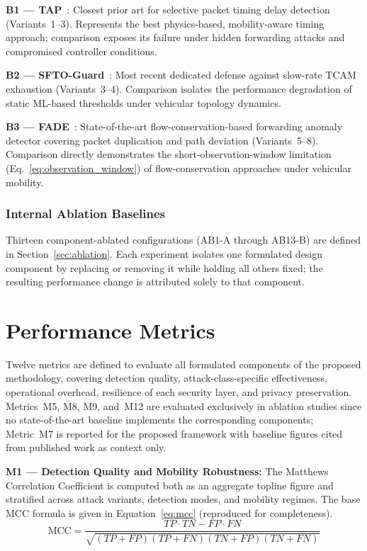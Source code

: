 \documentclass[12pt, a4paper]{report}
\begin{document}
{{\textbf{B1 — TAP}~\cite{Arsalan2018}: Closest prior art for
selective packet timing delay detection (Variants~1--3).
Represents the best physics-based, mobility-aware timing approach;
comparison exposes its failure under hidden forwarding attacks and
compromised controller conditions.

\textbf{B2 — SFTO-Guard}~\cite{Tang2023SFTO}: Most recent dedicated
defense against slow-rate TCAM exhaustion (Variants~3--4). Comparison
isolates the performance degradation of static ML-based thresholds
under vehicular topology dynamics.

\textbf{B3 — FADE}~\cite{Zhang2021FADE}: State-of-the-art
flow-conservation-based forwarding anomaly detector covering packet
duplication and path deviation (Variants~5--8). Comparison directly
demonstrates the short-observation-window limitation
(Eq.~\eqref{eq:observation_window}) of flow-conservation approaches
under vehicular mobility.

\subsubsection{Internal Ablation Baselines}
Thirteen component-ablated configurations
(AB1-A through AB13-B) are defined in
Section~\ref{sec:ablation}. Each experiment
isolates one formulated design component by
replacing or removing it while holding all
others fixed; the resulting performance change
is attributed solely to that component.

\section{Performance Metrics}
\label{sec:metrics}

Twelve metrics are defined to evaluate all formulated
components of the proposed methodology, covering detection
quality, attack-class-specific effectiveness, operational
overhead, resilience of each security layer, and privacy
preservation. Metrics~M5, M8, M9, and~M12 are evaluated
exclusively in ablation studies since no state-of-the-art
baseline implements the corresponding components; Metric~M7
is reported for the proposed framework with baseline figures
cited from published work as context only.


\textbf{M1 — Detection Quality and Mobility Robustness:}
The Matthews Correlation Coefficient is computed both
as an aggregate topline figure and stratified across
attack variants, detection modes, and mobility regimes.
The base \ac{MCC} formula is given in
Equation~\eqref{eq:mcc} (reproduced for completeness).
\begin{equation}
\text{MCC} =
\frac{TP \cdot TN - FP \cdot FN}
{\sqrt{(TP{+}FP)(TP{+}FN)(TN{+}FP)(TN{+}FN)}}
\label{eq:mcc}
\end{equation}



}}
\end{document}
